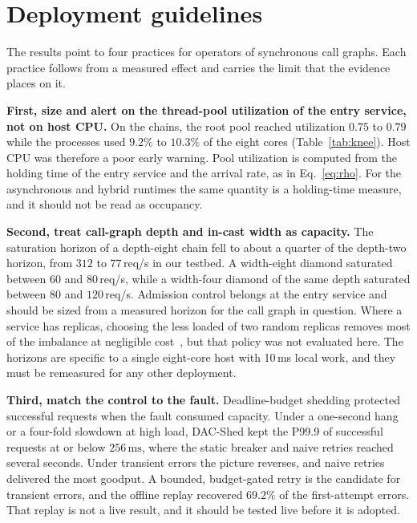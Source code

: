 \section{Deployment guidelines}
\label{sec:guidelines}

The results point to four practices for operators of synchronous call graphs. Each practice follows from a measured effect and carries the limit that the evidence places on it.

\textbf{First, size and alert on the thread-pool utilization of the entry service, not on host CPU.} On the chains, the root pool reached utilization $0.75$ to $0.79$ while the processes used $9.2\%$ to $10.3\%$ of the eight cores (Table~\ref{tab:knee}). Host CPU was therefore a poor early warning. Pool utilization is computed from the holding time of the entry service and the arrival rate, as in Eq.~\eqref{eq:rho}. For the asynchronous and hybrid runtimes the same quantity is a holding-time measure, and it should not be read as occupancy.

\textbf{Second, treat call-graph depth and in-cast width as capacity.} The saturation horizon of a depth-eight chain fell to about a quarter of the depth-two horizon, from $312$ to $77$\,req/s in our testbed. A width-eight diamond saturated between $60$ and $80$\,req/s, while a width-four diamond of the same depth saturated between $80$ and $120$\,req/s. Admission control belongs at the entry service and should be sized from a measured horizon for the call graph in question. Where a service has replicas, choosing the less loaded of two random replicas removes most of the imbalance at negligible cost~\cite{mitzenmacher2001power}, but that policy was not evaluated here. The horizons are specific to a single eight-core host with 10\,ms local work, and they must be remeasured for any other deployment.

\textbf{Third, match the control to the fault.} Deadline-budget shedding protected successful requests when the fault consumed capacity. Under a one-second hang or a four-fold slowdown at high load, DAC-Shed kept the P99.9 of successful requests at or below $256\,\mathrm{ms}$, where the static breaker and naive retries reached several seconds. Under transient errors the picture reverses, and naive retries delivered the most goodput. A bounded, budget-gated retry is the candidate for transient errors, and the offline replay recovered $69.2\%$ of the first-attempt errors. That replay is not a live result, and it should be tested live before it is adopted.

